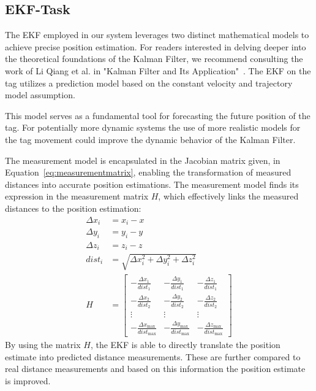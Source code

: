 \documentclass[conference, a4paper]{IEEEtran}
\begin{document}
\subsection{EKF-Task}\label{section:firmware-ekf}
The \ac{EKF} employed in our system leverages two distinct mathematical models
to achieve precise position estimation.
For readers interested in delving deeper into the theoretical foundations of the
Kalman Filter, we recommend consulting the work of Li Qiang et al. in
"Kalman Filter and Its Application"~\cite{Kalman}.
The EKF  on the tag utilizes a prediction model based on the constant velocity and trajectory model assumption.

This model serves as a fundamental tool for forecasting the future position of the tag.
For potentially more dynamic systems the use of more realistic models
for the tag movement could improve the dynamic behavior of the Kalman Filter.

The measurement model is encapsulated in the Jacobian matrix given, in Equation~\ref{eq:measurementmatrix},
enabling the transformation of measured distances into accurate position estimations.
The measurement model finds its expression in the measurement matrix $H$,
which effectively links the measured distances to the position estimation:
\begin{equation}
	\begin{aligned}
		\Delta x_i &= x_i - x \\
		\Delta y_i &= y_i - y \\
		\Delta z_i &= z_i - z \\
		dist_i &= \sqrt{{\Delta x_i^2 + \Delta y_i^2 + \Delta z_i^2}} \\
		H &= \begin{bmatrix}
			-\frac{{\Delta x_1}}{{dist_1}} & -\frac{{\Delta y_1}}{{dist_1}} & -\frac{{\Delta z_1}}{{dist_1}} \\
			-\frac{{\Delta x_2}}{{dist_2}} & -\frac{{\Delta y_2}}{{dist_2}} & -\frac{{\Delta z_2}}{{dist_2}} \\
			\vdots & \vdots & \vdots \\
			-\frac{{\Delta x_{\text{max}}}}{{dist_{\text{max}}}} & -\frac{{\Delta y_{\text{max}}}}{{dist_{\text{max}}}} & -\frac{{\Delta z_{\text{max}}}}{{dist_{\text{max}}}}
		\end{bmatrix}
	\end{aligned}
	\label{eq:measurementmatrix}
\end{equation}
By using the matrix $H$, the \ac{EKF} is able to directly translate the position estimate into predicted distance measurements.
These are further compared to real distance measurements and based on this information the position estimate is improved.
\end{document}

